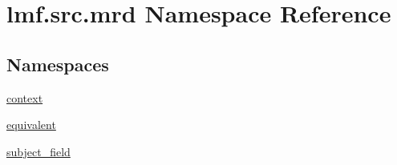 \hypertarget{namespacelmf_1_1src_1_1mrd}{\section{lmf.\+src.\+mrd Namespace Reference}
\label{namespacelmf_1_1src_1_1mrd}
}
\subsection*{Namespaces}
\begin{DoxyCompactItemize}
\item 
 \hyperlink{namespacelmf_1_1src_1_1mrd_1_1context}{context}
\item 
 \hyperlink{namespacelmf_1_1src_1_1mrd_1_1equivalent}{equivalent}
\item 
 \hyperlink{namespacelmf_1_1src_1_1mrd_1_1subject__field}{subject\+\_\+field}
\end{DoxyCompactItemize}
